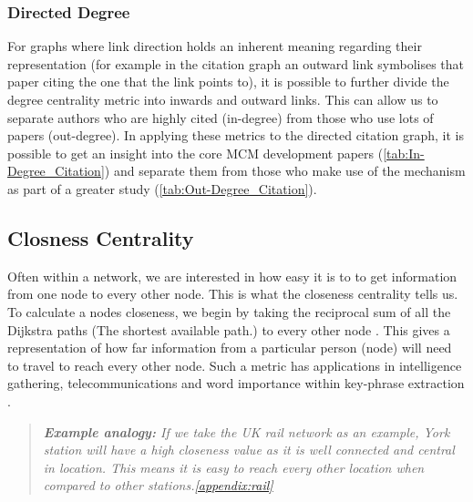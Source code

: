 % 
% 

\subsubsection*{Directed Degree}
For graphs where link direction holds an inherent meaning regarding their representation (for example in the citation graph an outward link symbolises that paper citing the one that the link points to), it is possible to further divide the degree centrality metric into inwards and outward links. This can allow us to separate authors who are highly cited (in-degree) from those who use lots of papers (out-degree). In applying these metrics to the directed citation graph, it is possible to get an insight into the core MCM development papers (\autoref{tab:In-Degree_Citation}) and separate them from those who make use of the mechanism as part of a greater study (\autoref{tab:Out-Degree_Citation}).








\subsection{Closness Centrality}\label{sec:closeness}
Often within a network, we are interested in how easy it is to to get information from one node to every other node. This is what the closeness centrality tells us. To calculate a nodes closeness, we begin by taking the reciprocal sum of all the Dijkstra paths (The shortest available path.) to every other node \citep{closeness-book,closeness}. 
This gives a representation of how far information from a particular person (node) will need to travel to reach every other node. Such a metric has applications in intelligence gathering, telecommunications and word importance within key-phrase extraction \citep{terror,examples_centrality,phrase}.

\begin{quote}
\textit{
\textbf{Example analogy:} If we take the UK rail network as an example, York station will have a high closeness value as it is well connected and central in location. This means it is easy to reach every other location when compared to other stations.\autoref{appendix:rail}
}
\end{quote}


